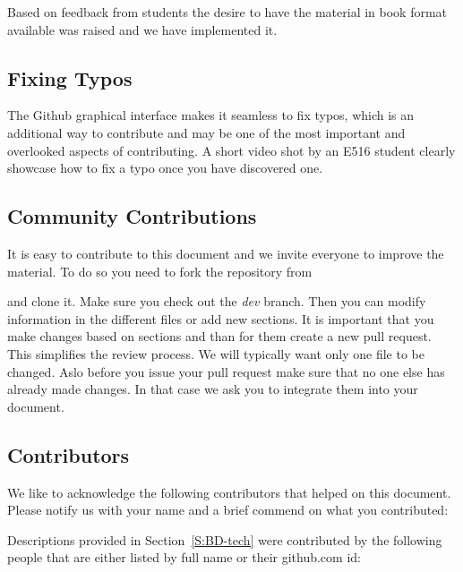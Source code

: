 
Based on feedback from students the desire to have the material in
book format available was raised and we have implemented it.

\subsection{Fixing Typos}

The Github graphical interface makes it seamless to fix typos, which
is an additional way to contribute and may be one of the most
important and overlooked aspects of contributing. A short video shot
by an E516 student clearly showcase how to fix a typo once you have
discovered one. 



\subsection{Community Contributions}

It is easy to contribute to this document and we invite everyone to
improve the material. To do so you need to fork the repository from 


and clone it. Make sure you check out the \textit{dev} branch. Then you
can modify information in the different files or add new sections. It
is important that you make changes based on sections and than for them
create a new pull request. This simplifies the review process. We will
typically want only one file to be changed. Aslo before you issue your
pull request make sure that no one else has already made changes. In
that case we ask you to integrate them into your document.


\subsection{Contributors}

We like to acknowledge the following contributors that helped on this
document. Please notify us with your name and a brief commend on what
you contributed:

Descriptions provided in Section~\ref{S:BD-tech} were contributed by the
following people that are either listed by full name or their
github.com id:

